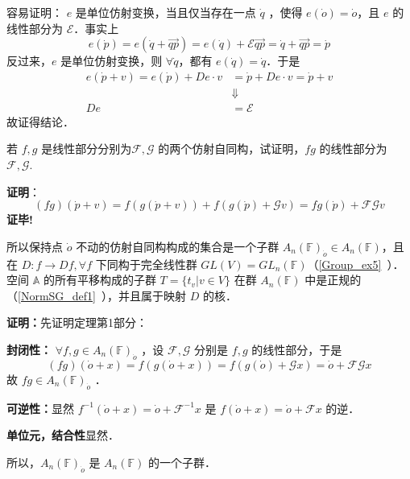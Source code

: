 容易证明： $e$ 是单位仿射变换，当且仅当存在一点 $\dot q$ ，使得 $e(\dot o)=\dot o$，且 $e$ 的线性部分为 $\mathcal E$．事实上
 \begin{equation}
  e(\dot p)=e(\dot q+\overrightarrow{qp})=e(\dot q)+\mathcal E \overrightarrow{qp}=\dot q+\overrightarrow{qp}=\dot p
 \end{equation}
反过来，$e$ 是单位仿射变换，则 $\forall\dot q$，都有 $e(\dot q)=\dot q$．于是
\begin{equation}
\begin{aligned}
e(\dot p+v)=e(\dot p)+De\cdot v&=\dot p+De\cdot v=\dot p+v\\
&\Downarrow\\
De&=\mathcal E
\end{aligned}
\end{equation}
故证得结论．
\begin{example}{}
若 $f,g$ 是线性部分分别为$\mathcal F,\mathcal G$ 的两个仿射自同构，试证明，$fg$ 的线性部分为 $\mathcal {F,G}$.

\textbf{证明}：\begin{equation}
(fg)(\dot p+v)=f(g(\dot p+v))+f(g(\dot p)+\mathcal G v)=fg(\dot p)+\mathcal {FG}v
\end{equation}
\textbf{证毕!}
\end{example}
\begin{theorem}{}
所以保持点 $\dot o$ 不动的仿射自同构构成的集合是一个子群 $A_n(\mathbb F)_{\dot o}\in A_n(\mathbb F)$，且在 $D:f\rightarrow Df,\forall f$ 下同构于完全线性群 $GL(V)=GL_n(\mathbb F)$（\autoref{Group_ex5}~）．空间 $\mathbb A$ 的所有平移构成的子群 $T=\{t_v|v\in V\}$ 在群 $A_n(\mathbb F)$ 中是正规的（\autoref{NormSG_def1}~），并且属于映射 $D$ 的核．
\end{theorem}
\textbf{证明：}先证明定理第1部分：

\textbf{封闭性：} $\forall f,g\in A_n(\mathbb F)_{\dot o}$ ，设 $\mathcal F,\mathcal G$ 分别是 $f,g$ 的线性部分，于是 
\begin{equation}
(fg)(\dot o+x)=f(g(\dot o+x))=f(g(\dot o)+\mathcal G x)=\dot o+\mathcal{FG}x
\end{equation}
故 $fg\in A_n(\mathbb F)_{\dot o}$ ．

\textbf{可逆性：}显然 $f^{-1}(\dot o+x)=\dot o+\mathcal F^{-1}x$ 是 $f(\dot o+x)=\dot o+\mathcal F x$ 的逆．

\textbf{单位元，结合性}显然．

所以，$A_n(\mathbb F)_{\dot o}$ 是 $A_n(\mathbb F)$ 的一个子群．

